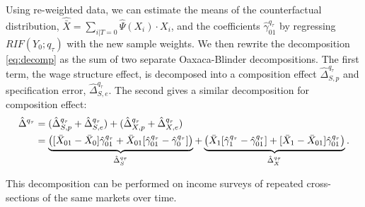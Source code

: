 Using re-weighted data, we can estimate the means of the counterfactual distribution, $\hat{\bar{X}}=\sum_{i|T=0}\hat{\Psi}(X_i) \cdot X_i$, and the coefficients $\hat{\gamma}_{01}^{q_\tau}$ by regressing $RIF(Y_0;q_\tau)$ with the new sample weights. We then rewrite the decomposition \eqref{eq:decomp} as the sum of two separate Oaxaca-Blinder decompositions. The first term, the wage structure effect, is decomposed into a composition effect $\hat{\Delta}^{q_\tau}_{S,p}$ and specification error, $\hat{\Delta}^{q_\tau}_{S,e}$. The second gives a similar decomposition for composition effect:
\begin{align}
  \hat{\Delta}^{q_\tau} &= (\hat{\Delta}^{q_\tau}_{S,p} + \hat{\Delta}^{q_\tau}_{S,e}) + (\hat{\Delta}^{q_\tau}_{X,p} + \hat{\Delta}^{q_\tau}_{X,e}) \notag \\
  &= \underbrace{\left( [\bar{X}_{01} - \bar{X}_0 ] \hat{\gamma}^{q_\tau}_{01} +
    \bar{X}_{01}[\hat{\gamma}_{01}^{q_\tau} - \hat{\gamma}_0^{q_\tau}] \right)}_{\hat{\Delta}^{q_\tau}_{S}} +
  \underbrace{\left( \bar{X}_{1}[\hat{\gamma}_{1}^{q_\tau} - \hat{\gamma}_{01}^{q_\tau}] + 
    [\bar{X}_{1} - \bar{X}_{01} ] \hat{\gamma}^{q_\tau}_{01}\right)}_{\hat{\Delta}^{q_\tau}_{X}}.
\end{align}

This decomposition can be performed on income surveys of repeated cross-sections of the same markets over time.

